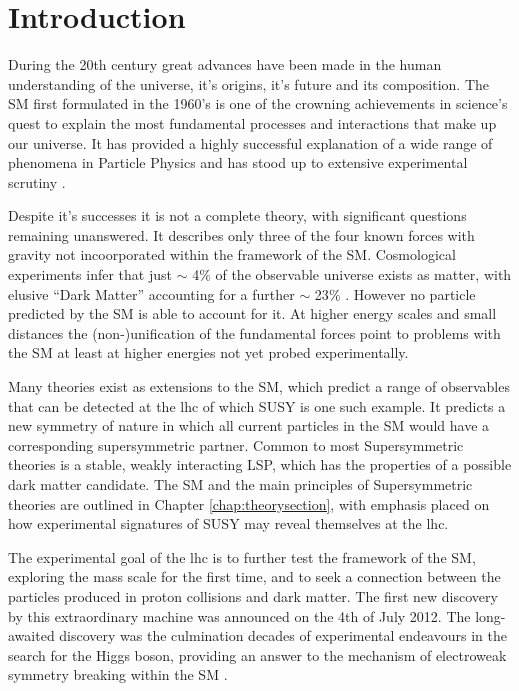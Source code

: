 \chapter{Introduction}
\label{chap:introduction}

During the 20th century great advances have been made in the human understanding of the universe, it's origins, it's future and its composition. The \acf{SM} first formulated in the 1960's is one of the crowning achievements in science's quest to explain the most fundamental processes and interactions that make up our universe. It has provided a highly successful explanation of a wide range of phenomena in Particle Physics and has stood up to extensive experimental scrutiny \cite{pdg2012}.

Despite it's successes it is not  a complete theory, with significant questions remaining unanswered. It describes only three of the four known forces with gravity not incoorporated within the framework of the \ac{SM}. Cosmological experiments infer that just $\sim$ 4$\%$ of the observable universe exists as matter, with elusive ``Dark Matter'' accounting for a further $\sim$ 23$\%$ \cite{0067-0049-208-2-19}. However no particle predicted by the \ac{SM} is able to account for it.  At higher energy scales and small distances the (non-)unification of the fundamental forces point to problems with the \ac{SM} at least at higher energies not yet probed experimentally. 

Many theories exist as extensions to the \ac{SM}, which predict a range of observables that can be detected at the \acf{lhc} of which \acf{SUSY} is one such example. It predicts a new symmetry of nature in which all current particles in the \ac{SM} would have a corresponding supersymmetric partner. Common to most Supersymmetric theories is a stable, weakly interacting \acf{LSP}, which has the properties of a possible dark matter candidate. The \ac{SM} and the main principles of Supersymmetric theories are outlined in Chapter \ref{chap:theorysection}, with emphasis placed on how experimental signatures of \ac{SUSY} may reveal themselves at the \ac{lhc}.

The experimental goal of the \ac{lhc} is to further test the framework of the \ac{SM}, exploring the \TeV mass scale for the first time, and to seek a connection between the particles produced in proton collisions and dark matter. The first new discovery by this extraordinary machine was announced on the 4th of July 2012. The long-awaited discovery was the culmination decades of experimental endeavours in the search for the Higgs boson, providing an answer to the mechanism of electroweak symmetry breaking within the \ac{SM} \cite{Aad:2012tfa}\cite{Chatrchyan:2012ufa}. 

